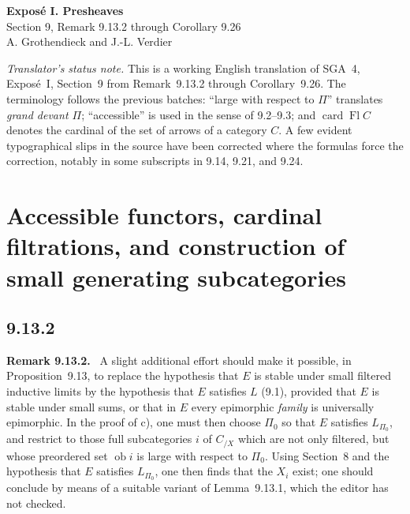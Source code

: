 \documentclass[11pt]{article}
\newcommand{\ob}{\operatorname{ob}}
\newcommand{\card}{\operatorname{card}}
\newcommand{\Fl}{\operatorname{Fl}}
\newenvironment{remarktext}[1]{\par\medskip\noindent\textbf{#1.}\ }{\par\medskip}
\begin{document}
\begin{center}
{\Large \textbf{Expos\'e I. Presheaves}}\\[0.35em]
{\large Section 9, Remark 9.13.2 through Corollary 9.26}\\[0.35em]
A. Grothendieck and J.-L. Verdier
\end{center}

\bigskip

\noindent\emph{Translator's status note.} This is a working English translation of SGA~4, Expos\'e~I, Section~9 from Remark~9.13.2 through Corollary~9.26. The terminology follows the previous batches: ``large with respect to $\Pi$'' translates \emph{grand devant $\Pi$}; ``accessible'' is used in the sense of 9.2--9.3; and $\card \Fl C$ denotes the cardinal of the set of arrows of a category $C$. A few evident typographical slips in the source have been corrected where the formulas force the correction, notably in some subscripts in 9.14, 9.21, and 9.24.

\setcounter{section}{8}
\section{Accessible functors, cardinal filtrations, and construction of small generating subcategories}

\setcounter{subsection}{13}
\subsection*{9.13.2}

\begin{remarktext}{Remark 9.13.2}
A slight additional effort should make it possible, in Proposition~9.13, to replace the hypothesis that $E$ is stable under small filtered inductive limits by the hypothesis that $E$ satisfies $L$ (9.1), provided that $E$ is stable under small sums, or that in $E$ every epimorphic \emph{family} is universally epimorphic. In the proof of c), one must then choose $\Pi_0$ so that $E$ satisfies $L_{\Pi_0}$, and restrict to those full subcategories $i$ of $C_{/X}$ which are not only filtered, but whose preordered set $\ob i$ is large with respect to $\Pi_0$. Using Section~8 and the hypothesis that $E$ satisfies $L_{\Pi_0}$, one then finds that the $X_i$ exist; one should conclude by means of a suitable variant of Lemma~9.13.1, which the editor has not checked.
\end{remarktext}
\end{document}
